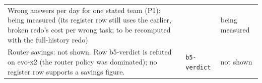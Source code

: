 \begin{longtable}{>{\raggedright\arraybackslash}p{}>{\raggedright\arraybackslash}p{}>{\raggedright\arraybackslash}p{}}
\small Wrong answers per day for one stated team (P1): being measured (its register row still uses the earlier, broken redo's cost per wrong task; to be recomputed with the full-history redo) & {\footnotesize \texttt{}} & \small being measured \\

\small Router savings: not shown. Row b5-verdict is refuted on evo-x2 (the router policy was dominated); no register row supports a savings figure. & {\footnotesize \texttt{b5-\allowbreak{}verdict}} & \small not shown \\

\bottomrule
\end{longtable}
